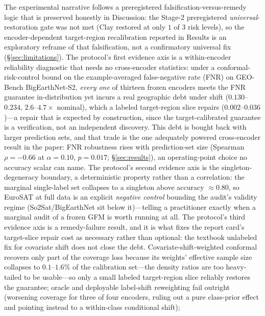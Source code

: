 \documentclass[preprint,11pt,authoryear]{elsarticle}
\begin{document}
 The experimental narrative follows a
preregistered falsification-versus-remedy logic that is preserved honestly in Discussion: the Stage-2 preregistered
\emph{universal}-restoration gate was not met (Clay restored at only $1$ of $3$ risk levels), so the
encoder-dependent target-region recalibration reported in Results is an exploratory reframe of that
falsification, not a confirmatory universal fix (\S\ref{sec:limitations}). The protocol's first evidence
axis is a within-encoder reliability diagnostic that needs no cross-encoder statistics: under a
conformal-risk-control \citep{angelopoulos2024crc} bound on the example-averaged false-negative rate (FNR)
on GEO-Bench BigEarthNet-S2, \emph{every one} of thirteen frozen encoders meets the FNR guarantee
in-distribution yet incurs a real geographic debt under shift ($0.130$--$0.234$, $2.6$--$4.7\times$
nominal), which a labeled target-region slice repairs ($0.002$--$0.036$)---a repair that is expected by
construction, since the target-calibrated guarantee is a verification, not an independent discovery. This
debt is bought back with larger prediction sets, and that trade is the one adequately powered cross-encoder
result in the paper: FNR robustness rises with prediction-set size (Spearman $\rho=-0.66$ at
$\alpha{=}0.10$, $p{=}0.017$; \S\ref{sec:results}), an operating-point choice no accuracy scalar can
name. The protocol's second evidence axis is the singleton-degeneracy boundary, a deterministic property
rather than a correlation: the marginal single-label set collapses to a singleton above accuracy
$\approx0.80$, so EuroSAT at full data is an explicit \emph{negative control} bounding the audit's validity
regime (So2Sat/BigEarthNet sit below it)---telling a practitioner exactly when a marginal audit of a frozen
GFM is worth running at all. The protocol's third evidence axis is a remedy-failure result, and it is what
fixes the report card's target-slice repair cost as necessary rather than optional: the textbook unlabeled
fix for covariate shift does not close the debt. Covariate-shift-weighted conformal
\citep{tibshirani2019covariate} recovers only part of the coverage loss because its weights' effective
sample size collapses to $0.1$--$1.6\%$ of the calibration set---the density ratios are too heavy-tailed to
be usable---so only a small labeled target-region slice reliably restores the guarantee; oracle and
deployable label-shift reweighting
\citep{lipton2018bbse,podkopaev2021labelshift} fail outright (worsening coverage for three of four
encoders, ruling out a pure class-prior effect and pointing instead to a within-class conditional shift);
\end{document}

